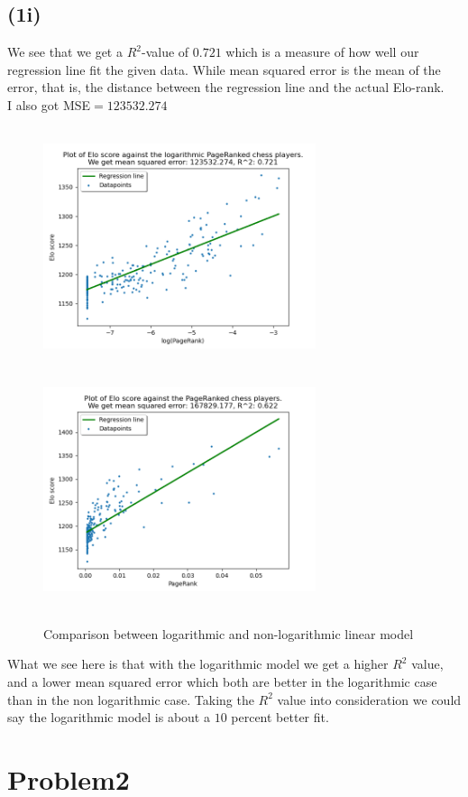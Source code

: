\documentclass[12pt, letterpaper]{article}
\begin{document}
    \subsection*{(1i)}
      We see that we get a $R^2$-value of $0.721$ which is a measure of how well our regression line fit the given data. While mean squared error is the mean of the error, that is, the distance between the regression line and the actual Elo-rank.\\
      I also got MSE$ = 123532.274$
      \newpage
      \begin{figure}[h]
        \caption{Comparison between logarithmic and non-logarithmic linear model}
        \centering
        \includegraphics[width=8cm, height=7cm]{logarithmic}
        \includegraphics[width=8cm, height=7cm]{nonlogarithmic}
      \end{figure}
      What we see here is that with the logarithmic model we get a higher $R^2$ value, and a lower mean squared error which both are better in the logarithmic case than in the non logarithmic case. Taking the $R^2$ value into consideration we could say the logarithmic model is about a $10$ percent better fit.
  \newpage
  \section*{Problem2}
\end{document}
